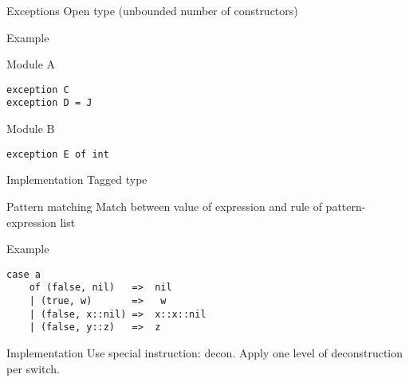 \documentclass[presentation]{beamer}
\begin{document}
\begin{frame}[fragile]{Exceptions}
Open type (unbounded number of constructors)
  \begin{block}{Example}
    \begin{block}{Module A}
\begin{verbatim}
exception C
exception D = J
\end{verbatim}
    \end{block}
    \begin{block}{Module B}
\begin{verbatim}
exception E of int
\end{verbatim}
    \end{block}
    \pause
    \begin{block}{Implementation}
      Tagged type 
    \end{block}
  \end{block}
\end{frame}

\begin{frame}[fragile]{Pattern matching}
Match between value of expression and rule of pattern-expression list
  \begin{block}{Example}
\begin{verbatim}
case a
    of (false, nil)   =>  nil
    | (true, w)       =>   w
    | (false, x::nil) =>  x::x::nil
    | (false, y::z)   =>  z
\end{verbatim}
  \end{block}
  \pause
  \begin{block}{Implementation}
    Use special instruction: decon.
    Apply one level of deconstruction per switch.
  \end{block}
\end{frame}
\end{document}
